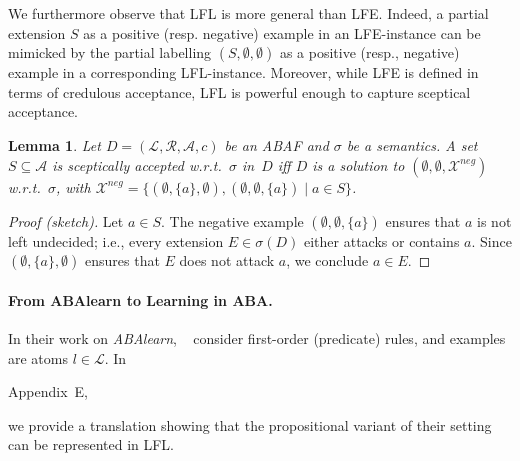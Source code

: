 \documentclass[letterpaper]{article} %
\newcommand{\lit}{\ensuremath{\mathcal{L}}}
\newcommand{\asm}{\ensuremath{\mathcal{A}}}
\newcommand{\atoms}{\mathcal{L}}
\newcommand{\ruleset}{\mathcal{R}}
\newcommand{\assumptions}{\mathcal{A}}
\newcommand{\contra}{c}
\newcommand{\ABAdef}{D=(\atoms,\ruleset,\assumptions,\contra)}
\newcommand{\Xneg}{\mathcal{X}^{neg}}
\newtheorem{lemma}[example]{Lemma}
\newif\ifappendix
\begin{document}
We furthermore observe that LFL is more general than LFE. Indeed, a partial extension $S$ as a positive (resp. negative) example in an LFE-instance can be mimicked by the partial labelling $(S,\emptyset,\emptyset)$ as a positive (resp., negative) example in a corresponding LFL-instance. 
%
Moreover, while LFE is defined in terms of credulous acceptance, LFL is powerful enough to capture sceptical acceptance.
\begin{lemma}
\label{lem:express skeptical with LFL}
    Let $\ABAdef$ be an ABAF and $\sigma$ be a semantics.
    A set $S\subseteq \asm$ is sceptically accepted w.r.t.\ $\sigma$ in~$D$ iff 
    $D$ is a solution to $(\emptyset,\emptyset,\Xneg)$  w.r.t.\ $\sigma$, with $\Xneg=\{ (\emptyset,\{a\},\emptyset),(\emptyset,\emptyset,\{a\}) \mid a\in S\}$.
\end{lemma}
\begin{proof}[Proof (sketch)]
Let $a\in S$. The negative example $(\emptyset,\emptyset,\{a\})$ ensures that $a$ is not left undecided; i.e., every extension $E\in \sigma(D)$ either attacks or contains $a$. Since $(\emptyset,\{a\},\emptyset)$ ensures that $E$ does not attack $a$, we conclude $a\in E$. 
\end{proof}




\paragraph{From ABAlearn to Learning in ABA.}
In their work on \emph{ABAlearn}, 
\citeauthor{ProiettiT22}~ 
consider first-order (predicate) rules, and examples are atoms $l\in\lit$.
In 
\ifappendix 
    Appendix~\ref{app:Francesca}, 
\else 
    Appendix~E, 
\fi
we provide a translation showing that the propositional variant of their setting can be represented in LFL. %

\end{document}

